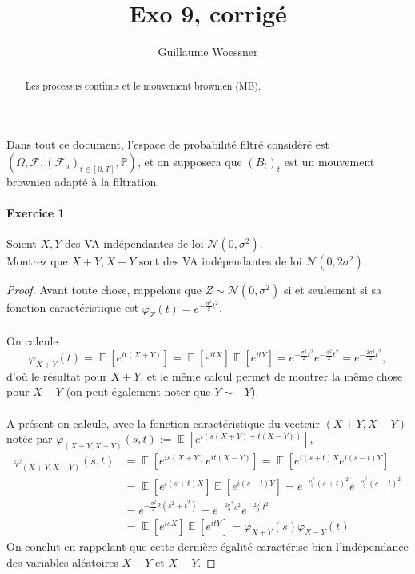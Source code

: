 \documentclass{article}
\title{Exo 9, corrigé}
\author{Guillaume Woessner}
\date{}                       %
\theoremstyle{definition}
\numberwithin{equation}{section}
\DeclareMathOperator{\E}{\mathbb{E}}
\begin{document}
\maketitle                    %

\begin{abstract}
\begin{center}
Les processus continus et le mouvement brownien (MB).
\end{center}
\end{abstract}



Dans tout ce document, l'espace de probabilité filtré considéré est $(\Omega,\mathcal{F},(\mathcal{F}_n)_{t\in[0,T]},\mathbb{P})$, et on supposera que $(B_t)_t$ est un mouvement brownien adapté à la filtration.






\paragraph{Exercice 1}
Soient $X,Y$ des VA indépendantes de loi $\mathcal{N}(0,\sigma^2)$.\\
Montrez que $X+Y,X-Y$ sont des VA indépendantes de loi $\mathcal{N}(0,2\sigma^2)$.

\begin{proof}
Avant toute chose, rappelons que $Z\sim \mathcal{N}(0,\sigma^2)$ si et seulement si sa fonction caractéristique est $\varphi_Z(t)=e^{- \frac{\sigma^2}{2}t^2}$.\\
~\\
On calcule 
$$\varphi_{X+Y}(t)=\E[e^{it(X+Y)}]=\E[e^{itX}]\E[e^{itY}]=e^{-\frac{\sigma^2}{2}t^2}e^{-\frac{\sigma^2}{2}t^2}=e^{-\frac{2\sigma^2}{2}t^2},$$
d'où le résultat pour $X+Y$, et le même calcul permet de montrer la même chose pour $X-Y$ (on peut également noter que $Y\sim-Y$).\\
~\\
A présent on calcule, avec la fonction caractéristique du vecteur $(X+Y,X-Y)$ notée par $\varphi_{(X+Y,X-Y)}(s,t):=\E[e^{i(s(X+Y)+t(X-Y))}]$,
\begin{align*}
    \varphi_{(X+Y,X-Y)}(s,t) &= \E[e^{is(X+Y)}e^{it(X-Y)}]=\E[e^{i(s+t)X}e^{i(s-t)Y}]\\
    &= \E[e^{i(s+t)X}]\E[e^{i(s-t)Y}]=e^{-\frac{\sigma^2}{2}(s+t)^2}e^{-\frac{\sigma^2}{2}(s-t)^2}\\
    &=e^{-\frac{\sigma^2}{2}2(s^2+t^2)}=e^{-\frac{2\sigma^2}{2}s^2}e^{-\frac{2\sigma^2}{2}t^2}\\
    &=\E[e^{isX}]\E[e^{itY}]=\varphi_{X+Y}(s)\varphi_{X-Y}(t)
\end{align*}
On conclut en rappelant que cette dernière égalité caractérise bien l'indépendance des variables aléatoires $X+Y$ et $X-Y$.
\end{proof}
\end{document}
